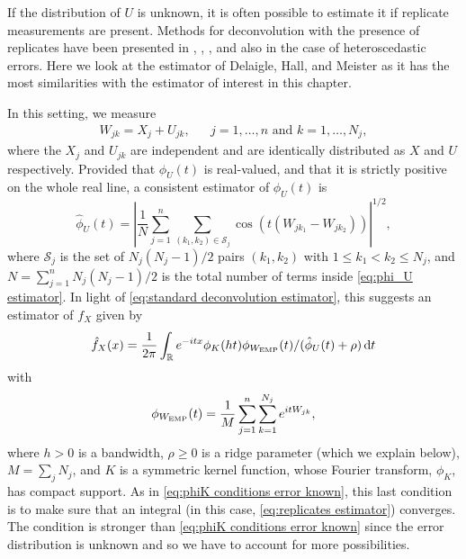 	If the distribution of $U$ is unknown, it is often possible to estimate it if replicate measurements are present. Methods for deconvolution with the presence of replicates have been presented in \cite{Li1998-mj}, \cite{Lin2006-mm}, \cite{Delaigle2008-hl}, and also \cite{McIntyre2011-fg} in the case of heteroscedastic errors. Here we look at the estimator of Delaigle, Hall, and Meister \cite{Delaigle2008-hl} as it has the most similarities with the estimator of interest in this chapter.

	In this setting, we measure
	\begin{align}
		W_{jk} = X_j + U_{jk}, && j = 1, \dots, n \text{ and } k = 1, \dots, N_j,
	\end{align}
	where the $X_j$ and $U_{jk}$ are independent and are identically distributed as $X$ and $U$ respectively. Provided that $\phi_U(t)$ is real-valued, and that it is strictly positive on the whole real line, a consistent estimator of $\phi_U(t)$ is
	\begin{equation}
		\hat{\phi}_U(t) = \left|\frac{1}{N} \sum_{j = 1}^n \sum_{(k_1, k_2) \in \mathscr{S}_j} \cos \left(t (W_{jk_1} - W_{jk_2})\right)\right|^{1/2},
		\label{eq:phi_U estimator}
	\end{equation}
	where $\mathscr{S}_j$ is the set of $N_j(N_j - 1)/2$ pairs $(k_1, k_2)$ with $1 \leq k_1 < k_2 \leq N_j$, and $N = \sum_{j=1}^n N_j(N_j - 1)/2$ is the total number of terms inside \eqref{eq:phi_U estimator}.
	In light of \eqref{eq:standard deconvolution estimator}, this suggests an estimator of $f_X$ given by 
	\begin{equation}
	\label{eq:replicates estimator}
		\hat{f}_X(x) = \frac{1}{2\pi} \int_\mathbb{R} e^{-itx} \phi_K(ht) \phi_{W_\mathrm{EMP}}(t)  / (\hat{\phi}_U(t) + \rho )\, \mathrm{d} t
	\end{equation}
	with
	\begin{equation}
		\phi_{W_\mathrm{EMP}}(t) = \frac{1}{M} \sum_{j = 1}^n \sum_{k= 1}^{N_j} e^{i t W_{jk}},
	\end{equation}
	where
	$h > 0$ is a bandwidth, $\rho \geq 0$ is a ridge parameter (which we explain below), $M = \sum_j N_j$, and $K$ is a symmetric kernel function, whose Fourier transform, $\phi_K$, has compact support. As in \eqref{eq:phiK conditions error known}, this last condition is to make sure that an integral (in this case, \eqref{eq:replicates estimator}) converges. The condition is stronger than \eqref{eq:phiK conditions error known} since the error distribution is unknown and so we have to account for more possibilities.

